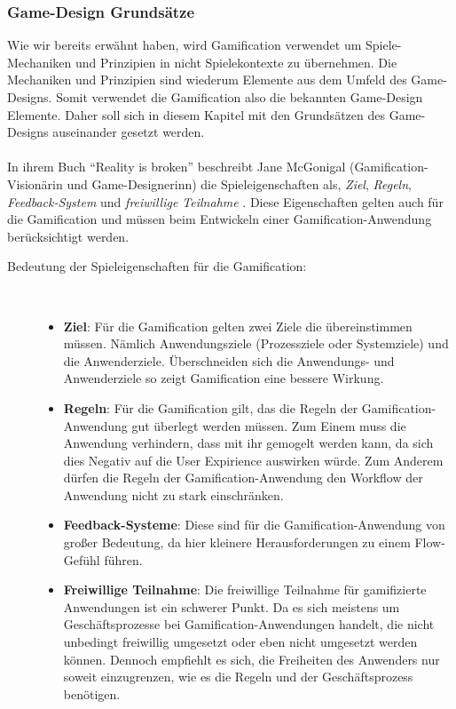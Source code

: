 \documentclass[a4paper,12pt]{scrartcl}
\begin{document}
\subsubsection{Game-Design Grundsätze}
Wie wir bereits erwähnt haben, wird Gamification verwendet um Spiele-Mechaniken und Prinzipien in nicht Spielekontexte zu übernehmen. Die Mechaniken und Prinzipien sind wiederum Elemente aus dem Umfeld des Game-Designs. Somit verwendet die Gamification also die bekannten Game-Design Elemente. Daher soll sich in diesem Kapitel mit den Grundsätzen des Game-Designs auseinander gesetzt werden.
\\\\
In ihrem Buch \enquote{Reality is broken} beschreibt Jane McGonigal (Gamification-Visionärin und Game-Designerinn) die Spieleigenschaften als, \textit{Ziel}, \textit{Regeln}, \textit{Feedback-System} und \textit{freiwillige Teilnahme} \cite{Mcgonigal2011}. Diese Eigenschaften gelten auch für die Gamification und müssen beim Entwickeln einer Gamification-Anwendung berücksichtigt werden.
\begin{description}
   \item[Bedeutung der Spieleigenschaften für die Gamification:]~\par
   \begin{itemize}
      \item \textbf{Ziel}: Für die Gamification gelten zwei Ziele die übereinstimmen müssen. Nämlich Anwendungsziele (Prozessziele oder Systemziele) und die Anwenderziele. Überschneiden sich die Anwendungs- und Anwenderziele so zeigt Gamification eine bessere Wirkung. 
      \item \textbf{Regeln}: Für die Gamification gilt, das die Regeln der Gamification-Anwendung gut überlegt werden müssen. Zum Einem muss die Anwendung verhindern, dass mit ihr gemogelt werden kann, da sich dies Negativ auf die User Expirience auswirken würde. Zum Anderem dürfen die Regeln der Gamification-Anwendung den Workflow der Anwendung nicht zu stark einschränken.
      \item \textbf{Feedback-Systeme}: Diese sind für die Gamification-Anwendung von großer Bedeutung, da hier kleinere Herausforderungen zu einem Flow-Gefühl führen.
      \item \textbf{Freiwillige Teilnahme}: Die freiwillige Teilnahme für gamifizierte Anwendungen ist ein schwerer Punkt. Da es sich meistens um Geschäftsprozesse bei Gamification-Anwendungen handelt, die nicht unbedingt freiwillig umgesetzt oder eben nicht umgesetzt werden können. Dennoch empfiehlt es sich, die Freiheiten des Anwenders nur soweit einzugrenzen, wie es die Regeln und der Geschäftsprozess benötigen. 
   \end{itemize}
\end{description}
\end{document}
